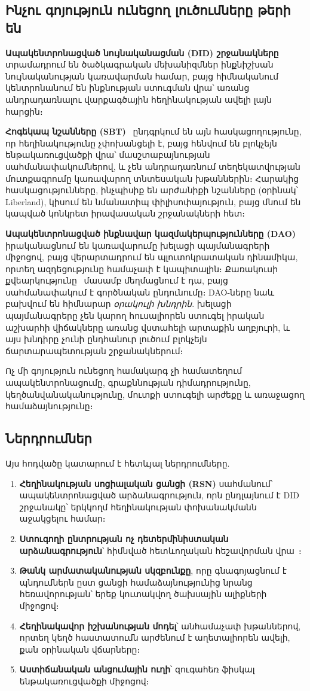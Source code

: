 \documentclass[11pt,a4paper,twocolumn]{article}
\begin{document}
\subsection{Ինչու գոյություն ունեցող լուծումները թերի են}

\textbf{Ապակենտրոնացված նույնականացման (DID) շրջանակները}~\cite{did2022} տրամադրում են ծածկագրական մեխանիզմներ ինքնիշխան նույնականության կառավարման համար, բայց հիմնականում կենտրոնանում են ինքնության ստուգման վրա՝ առանց անդրադառնալու վարքագծային հեղինակության ավելի լայն հարցին։

\textbf{Հոգեկապ նշանները (SBT)}~\cite{weyl2022} ընդգրկում են այն հասկացողությունը, որ հեղինակությունը չփոխանցելի է, բայց հենվում են բլոկչեյն ենթակառուցվածքի վրա՝ մասշտաբայնության սահմանափակումներով, և չեն անդրադառնում տեղեկատվության մուտքագրումը կառավարող տնտեսական խթաններին։ Հարակից հասկացությունները, ինչպիսիք են արժանիքի նշանները (օրինակ՝ Liberland), կիսում են նմանատիպ փիլիսոփայություն, բայց մնում են կապված կոնկրետ իրավասական շրջանակների հետ։

\textbf{Ապակենտրոնացված ինքնավար կազմակերպությունները (DAO)}~\cite{buterin2014} իրականացնում են կառավարումը խելացի պայմանագրերի միջոցով, բայց վերարտադրում են պլուտոկրատական դինամիկա, որտեղ ազդեցությունը համաչափ է կապիտալին։ Քառակուսի քվեարկությունը~\cite{buterin2019} մասամբ մեղմացնում է դա, բայց սահմանափակում է գործնական ընդունումը։ DAO-ները նաև բախվում են հիմնարար \emph{օրակուլի խնդրին}. խելացի պայմանագրերը չեն կարող հուսալիորեն ստուգել իրական աշխարհի վիճակները առանց վստահելի արտաքին աղբյուրի, և այս խնդիրը չունի ընդհանուր լուծում բլոկչեյն ճարտարապետության շրջանակներում։

Ոչ մի գոյություն ունեցող համակարգ չի համատեղում ապակենտրոնացումը, գրաքննության դիմադրությունը, կեղծանվանականությունը, մուտքի ստուգելի արժեքը և առաջացող համաձայնությունը։

\subsection{Ներդրումներ}

Այս հոդվածը կատարում է հետևյալ ներդրումները.
\begin{enumerate}[nosep]
\item \textbf{Հեղինակության սոցիալական ցանցի (RSN)} սահմանում՝ ապակենտրոնացված արձանագրություն, որն ընդլայնում է DID շրջանակը՝ երկկողմ հեղինակության փոխանակմանն աջակցելու համար։
\item \textbf{Ստուգողի ընտրության ոչ դետերմինիստական արձանագրություն}՝ հիմնված հետևողական հեշավորման վրա~\cite{karger1997}։
\item \textbf{Թանկ արմատականության սկզբունքը}, որը գնագոյացնում է պնդումներն ըստ ցանցի համաձայնությունից նրանց հեռավորության՝ երեք կուտակվող ծախսային ալիքների միջոցով։
\item \textbf{Հեղինակավոր իշխանության մոդել}՝ անհամաչափ խթաններով, որտեղ կեղծ հաստատումն արժենում է աղետալիորեն ավելի, քան օրինական վճարները։
\item \textbf{Աստիճանական անցումային ուղի}՝ զուգահեռ ֆիսկալ ենթակառուցվածքի միջոցով։
\end{enumerate}
\end{document}
